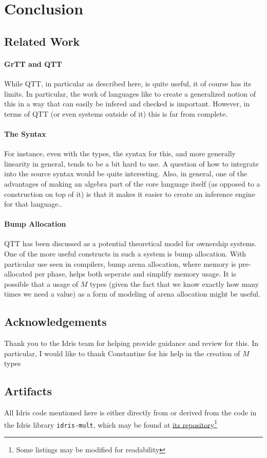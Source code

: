 \section{Conclusion}

\subsection*{Related Work}

\paragraph{GrTT and QTT}
While QTT, in particular as described here, is quite useful, it of course has its limits.
In particular, the work of languages like \granule to create a generalized notion of this in a way that can easily be infered and checked is important.
However, in terms of QTT (or even systems outside of it) this is far from complete.

\paragraph{The Syntax}
For instance, even with the \carat types, the syntax for this, and more generally linearity in general, tends to be a bit hard to use.
A question of how to integrate into the source syntax would be quite interesting.
Also, in general, one of the advantages of making an algebra part of the core language itself (as opposed to a construction on top of it) is that it makes it easier to create an inference engine for that language..

\paragraph{Bump Allocation}
QTT has been discussed as a potential theoretical model for ownership systems.
One of the more useful constructs in such a system is bump allocation.
With particular use seen in compilers, bump arena allocation, where memory is pre-allocated per phase, helps both seperate and simplify memory usage.
It is possible that a usage of $M$ types (given the fact that we know exactly how many times we need a value) as a form of modeling of arena allocation might be useful.


\subsection*{Acknowledgements}

Thank you to the Idris team for helping provide guidance and review for this.
In particular, I would like to thank Constantine for his help in the creation of $M$ types

\subsection*{Artifacts}

\label{sec:this_lib}
All Idris code mentioned here is either directly from or derived from the code in the Idris library \verb|idris-mult|, which may be found at \href{https://github.com/wizard7377/idris-mult}{its repository}\footnote{Some listings may be modified for readability}
